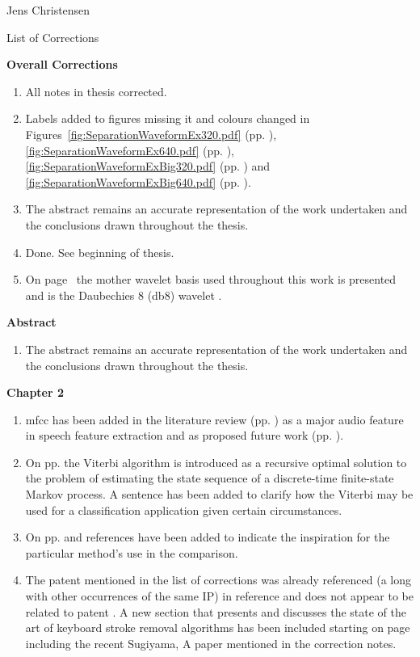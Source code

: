 \clearpage
\thispagestyle{empty}
Jens Christensen

List of Corrections

\textbf{Overall Corrections}

\begin{enumerate}
  \item All notes in thesis corrected.
  \item Labels added to figures missing it and colours changed in Figures~\ref{fig:SeparationWaveformEx320.pdf} (pp. \pageref{fig:SeparationWaveformEx320.pdf}), \ref{fig:SeparationWaveformEx640.pdf} (pp. \pageref{fig:SeparationWaveformEx640.pdf}), \ref{fig:SeparationWaveformExBig320.pdf} (pp. \pageref{fig:SeparationWaveformExBig320.pdf}) and \ref{fig:SeparationWaveformExBig640.pdf} (pp. \pageref{fig:SeparationWaveformExBig640.pdf}).
  \item The abstract remains an accurate representation of the work undertaken and the conclusions drawn throughout the thesis.
  \item Done. See beginning of thesis.
  \item On page~\pageref{corrections:motherWavelet} the mother wavelet basis used throughout this work is presented and is the Daubechies 8 (db8) wavelet \cite{Daubechies1992}.
\end{enumerate}

\textbf{Abstract}
\begin{enumerate}
  \item The abstract remains an accurate representation of the work undertaken and the conclusions drawn throughout the thesis.
\end{enumerate}

\textbf{Chapter 2}
\begin{enumerate}
\item \gls{mfcc} has been added in the literature review (pp. \pageref{corrections:mfcc1}) as a major audio feature in speech feature extraction and as proposed future work (pp. \pageref{corrections:mfcc2}).
    \item On pp. \pageref{corrections:viterbi} the Viterbi algorithm is introduced as a recursive optimal solution to the problem of estimating the state sequence of a discrete-time finite-state Markov process. A sentence has been added to clarify how the Viterbi may be used for a classification application given certain circumstances.
    \item On pp. \pageref{fig:LitRev_DetectCompare} and \pageref{fig:LitRev_DetectCompare2} references have been added to indicate the inspiration for the particular method's use in the comparison.
    \item The patent mentioned in the list of corrections was already referenced (a long with other occurrences of the same IP) in reference \cite{Seltzer2011Patent} and does not appear to be related to patent \cite{US8233353}. A new section that presents and discusses the state of the art of keyboard stroke removal algorithms has been included starting on page \pageref{corrections:methods} including the recent Sugiyama, A paper mentioned in the correction notes.
    \end{enumerate}
    
